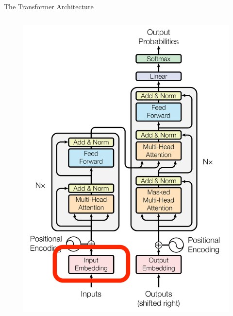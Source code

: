 \documentclass[aspectratio=169]{beamer}
\begin{document}
\begin{frame}{The Transformer Architecture}
\begin{columns}
\begin{column}{0.5\textwidth}
\begin{center}
\begin{figure}
\begin{overprint}
	 \includegraphics[height=\paperheight]{figures/transformer_in_embed}

\end{overprint}
\end{figure}
\end{center}
\end{column}
\end{columns}
\end{frame}
\end{document}
